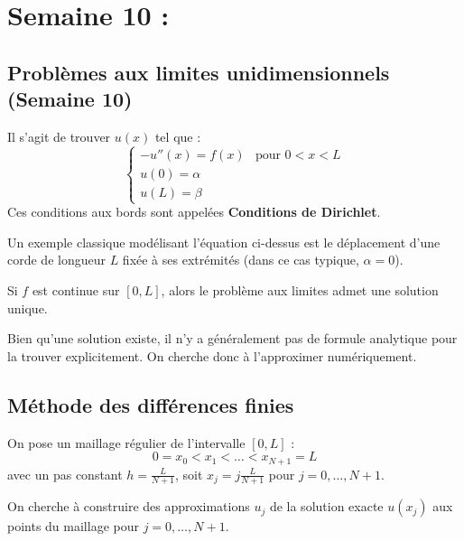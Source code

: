 \section{Semaine 10 : }

\subsection*{Problèmes aux limites unidimensionnels (Semaine 10)}

Il s'agit de trouver $u(x)$ tel que :
$$
\begin{cases}
-u''(x) = f(x) & \text{pour } 0 < x < L \\
u(0) = \alpha & \\
u(L) = \beta &
\end{cases}
$$
Ces conditions aux bords sont appelées \textbf{Conditions de Dirichlet}.

\begin{exemple}
Un exemple classique modélisant l'équation ci-dessus est le déplacement d'une corde de longueur $L$ fixée à ses extrémités (dans ce cas typique, $\alpha = 0$).
\end{exemple}

\begin{theoreme}
Si $f$ est continue sur $[0, L]$, alors le problème aux limites admet une solution unique.
\end{theoreme}

\begin{remarque}
Bien qu'une solution existe, il n'y a généralement pas de formule analytique pour la trouver explicitement. On cherche donc à l'approximer numériquement.
\end{remarque}

\subsection{Méthode des différences finies}

On pose un maillage régulier de l'intervalle $[0, L]$ :
$$0 = x_0 < x_1 < \dots < x_{N+1} = L$$
avec un pas constant $h = \frac{L}{N+1}$, soit $x_j = j \frac{L}{N+1}$ pour $j = 0, \dots, N+1$.

On cherche à construire des approximations $u_j$ de la solution exacte $u(x_j)$ aux points du maillage pour $j = 0, \dots, N+1$.

